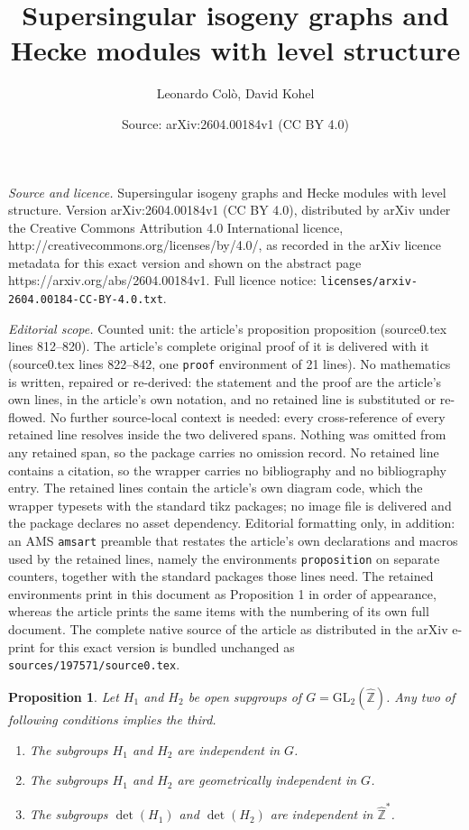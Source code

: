 \documentclass[10pt,a4paper]{amsart}
\title{Supersingular isogeny graphs and Hecke modules with level structure}
\author{Leonardo Col\`o, David Kohel}
\date{Source: arXiv:2604.00184v1 (CC BY 4.0)}
\newtheorem{proposition}{Proposition}
\newcommand{\GL}{\mathrm{GL}}
\newcommand{\ZZ}{\mathbb{Z}}
\newcommand{\ZZhat}{\widehat{\ZZ}}
\begin{document}
\maketitle

\noindent\emph{Source and licence.} Supersingular isogeny graphs and Hecke modules with level structure. Version arXiv:2604.00184v1 (CC BY 4.0), distributed by arXiv under the Creative Commons Attribution 4.0 International licence, http://creativecommons.org/licenses/by/4.0/, as recorded in the arXiv licence metadata for this exact version and shown on the abstract page https://arxiv.org/abs/2604.00184v1. Full licence notice: \texttt{licenses/arxiv-2604.00184-CC-BY-4.0.txt}.\par\smallskip

\noindent\textit{Editorial scope.} Counted unit: the article's proposition proposition (source0.tex lines 812--820). The article's complete original proof of it is delivered with it (source0.tex lines 822--842, one \texttt{proof} environment of 21 lines). No mathematics is written, repaired or re-derived: the statement and the proof are the article's own lines, in the article's own notation, and no retained line is substituted or re-flowed.  No further source-local context is needed: every cross-reference of every retained line resolves inside the two delivered spans.  Nothing was omitted from any retained span, so the package carries no omission record.  No retained line contains a citation, so the wrapper carries no bibliography and no bibliography entry.  The retained lines contain the article's own diagram code, which the wrapper typesets with the standard tikz packages; no image file is delivered and the package declares no asset dependency.  Editorial formatting only, in addition: an AMS \texttt{amsart} preamble that restates the article's own declarations and macros used by the retained lines, namely the environments \texttt{proposition} on separate counters, together with the standard packages those lines need.  The retained environments print in this document as Proposition 1 in order of appearance, whereas the article prints the same items with the numbering of its own full document.  The complete native source of the article as distributed in the arXiv e-print for this exact version is bundled unchanged as \texttt{sources/197571/source0.tex}.
\begin{proposition}
  Let $H_1$ and $H_2$ be open supgroups of $G = \GL_2(\ZZhat)$. Any two of following
  conditions implies the third.
  \begin{enumerate} %
    \item The subgroups $H_1$ and $H_2$ are independent in $G$.
    \item The subgroups $H_1$ and $H_2$ are geometrically independent in $G$.
    \item The subgroups $\det(H_1)$ and $\det(H_2)$ are independent in $\ZZhat^*$.
  \end{enumerate} %
\end{proposition}
\end{document}
